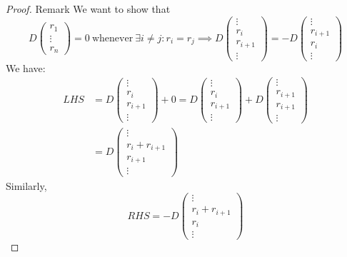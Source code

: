 \begin{proof} {Remark}
    \pffwd We want to show that \[
        D\left(\begin{array}{c}
                r_1 \\ \vdots \\ r_n
            \end{array}\right) = 0 \:\text{whenever}\: \exists i \neq j: r_i = r_j \implies D \left(\begin{array}{c}
                \vdots \\ r_i \\ r_{i+1} \\ \vdots
            \end{array}\right) = -D \left(\begin{array}{c}
                \vdots \\ r_{i+1} \\ r_i \\ \vdots
            \end{array}\right)
    \]
    We have:
    \begin{align*}
        LHS &= D \left(\begin{array}{c}
            \vdots \\ r_i \\ r_{i+1} \\ \vdots
        \end{array}\right) + 0
        = D \left(\begin{array}{c}
            \vdots \\ r_i \\ r_{i+1} \\ \vdots
        \end{array}\right) + D \left(\begin{array}{c}
            \vdots \\ r_{i+1} \\ r_{i+1} \\ \vdots
        \end{array}\right) \\
        &= D \left(\begin{array}{c}
            \vdots \\ r_i + r_{i+1} \\ r_{i+1} \\ \vdots
        \end{array}\right)
    \end{align*}
    Similarly, \[
    RHS = -D \left(\begin{array}{c}
        \vdots \\ r_i + r_{i+1} \\ r_i \\ \vdots
    \end{array}\right)
    \]


\end{proof}
